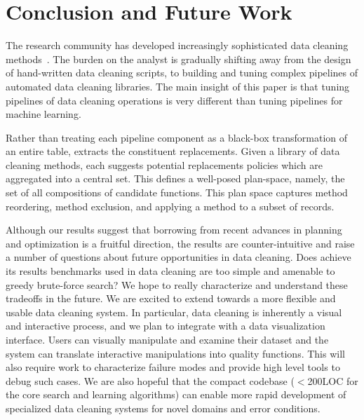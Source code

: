 \section{Conclusion and Future Work}
The research community has developed increasingly sophisticated data cleaning methods~\cite{dc, rekatsinas2017holoclean, DBLP:journals/pvldb/KrishnanWWFG16, DBLP:conf/sigmod/ChuIKW16, mudgal2018deep, doan2018toward}.
The burden on the analyst is gradually shifting away from the design of hand-written data cleaning scripts, to building and tuning complex pipelines of automated data cleaning libraries.
The main insight of this paper is that tuning pipelines of data cleaning operations is very different than tuning pipelines for machine learning.

Rather than treating each pipeline component as a black-box transformation of an entire table, \sys extracts the constituent replacements. Given a library of data cleaning methods, each suggests potential replacements policies which are aggregated into a central set. This defines a well-posed plan-space, namely, the set of all compositions of candidate functions. This plan space captures method reordering, method exclusion, and applying a method to a subset of records.
  
Although our results suggest that borrowing from recent advances in planning and optimization is a fruitful direction, the results are counter-intuitive and raise a number of questions about future opportunities in data cleaning.  Does \sys achieve its results benchmarks used in data cleaning are too simple and amenable to greedy brute-force search?  
We hope to really characterize and understand these tradeoffs in the future. We are excited to extend \sys towards a more flexible and usable data cleaning system.  In particular, data cleaning is inherently a visual and interactive process, and we plan to integrate \sys with a data visualization interface.   Users can visually manipulate and examine their dataset and the system can translate interactive manipulations into quality functions.  This will also require work to characterize failure modes and provide high level tools to debug such cases.  We are also hopeful that the compact codebase ($<$200LOC for the core search and learning algorithms) can enable more rapid development of specialized data cleaning systems for novel domains and error conditions.  




